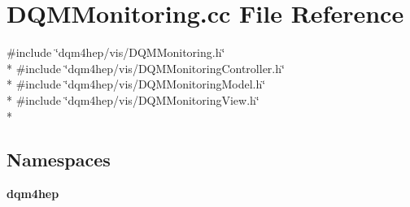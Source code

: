\section{D\+Q\+M\+Monitoring.\+cc File Reference}
\label{DQMMonitoring_8cc}
{\ttfamily \#include \char`\"{}dqm4hep/vis/\+D\+Q\+M\+Monitoring.\+h\char`\"{}}\\*
{\ttfamily \#include \char`\"{}dqm4hep/vis/\+D\+Q\+M\+Monitoring\+Controller.\+h\char`\"{}}\\*
{\ttfamily \#include \char`\"{}dqm4hep/vis/\+D\+Q\+M\+Monitoring\+Model.\+h\char`\"{}}\\*
{\ttfamily \#include \char`\"{}dqm4hep/vis/\+D\+Q\+M\+Monitoring\+View.\+h\char`\"{}}\\*
\subsection*{Namespaces}
\begin{DoxyCompactItemize}
\item 
 {\bf dqm4hep}
\end{DoxyCompactItemize}
